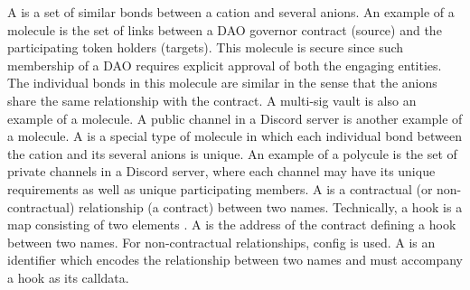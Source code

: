 \documentclass[a4paper,10pt]{article}
\begin{document}
\begin{flushleft}
{{		A {} is a set of similar bonds between a cation and several anions. An example of a molecule is the set of links between a DAO governor contract (source) and the participating token holders (targets). This molecule is secure since such membership of a DAO requires explicit approval of both the engaging entities. The individual bonds in this molecule are similar in the sense that the anions share the same relationship with the contract. A multi-sig vault is also an example of a molecule. A public channel in a Discord server is another example of a molecule.\linebreak\linebreak
		A {} is a special type of molecule in which each individual bond between the cation and its several anions is unique. An example of a polycule is the set of private channels in a Discord server, where each channel may have its unique requirements as well as unique participating members.\linebreak\linebreak
		A {} is a contractual (or non-contractual) relationship (a contract) between two names. Technically, a hook is a map consisting of two elements .\linebreak\linebreak
		A {} is the address of the contract defining a hook between two names. For non-contractual relationships,  config is used.\linebreak\linebreak
		A {} is an identifier which encodes the relationship between two names and must accompany a hook as its calldata.\linebreak\linebreak
	}}
\end{flushleft}
\end{document}
